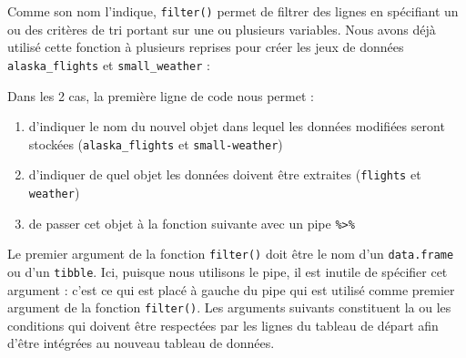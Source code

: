 \documentclass[a4paperpaper,]{article}
\newenvironment{Shaded}{\begin{snugshade}}{\end{snugshade}}
\newcommand{\DecValTok}[1]{\textcolor[rgb]{0.69,0.50,0.00}{#1}}
\newcommand{\KeywordTok}[1]{\textcolor[rgb]{0.12,0.11,0.11}{\textbf{#1}}}
\newcommand{\NormalTok}[1]{\textcolor[rgb]{0.12,0.11,0.11}{#1}}
\newcommand{\OperatorTok}[1]{\textcolor[rgb]{0.12,0.11,0.11}{#1}}
\newcommand{\StringTok}[1]{\textcolor[rgb]{0.75,0.01,0.01}{#1}}
\providecommand{\tightlist}{%
  \setlength{\itemsep}{0pt}\setlength{\parskip}{0pt}}
\begin{document}
Comme son nom l'indique, \texttt{filter()} permet de filtrer des lignes en spécifiant un ou des critères de tri portant sur une ou plusieurs variables. Nous avons déjà utilisé cette fonction à plusieurs reprises pour créer les jeux de données \texttt{alaska\_flights} et \texttt{small\_weather} :

\begin{Shaded}
\end{Shaded}

\begin{Shaded}
\end{Shaded}

Dans les 2 cas, la première ligne de code nous permet :

\begin{enumerate}
\def\labelenumi{\arabic{enumi}.}
\tightlist
\item
  d'indiquer le nom du nouvel objet dans lequel les données modifiées seront stockées (\texttt{alaska\_flights} et \texttt{small-weather})
\item
  d'indiquer de quel objet les données doivent être extraites (\texttt{flights} et \texttt{weather})
\item
  de passer cet objet à la fonction suivante avec un pipe \texttt{\%\textgreater{}\%}
\end{enumerate}

Le premier argument de la fonction \texttt{filter()} doit être le nom d'un \texttt{data.frame} ou d'un \texttt{tibble}. Ici, puisque nous utilisons le pipe, il est inutile de spécifier cet argument : c'est ce qui est placé à gauche du pipe qui est utilisé comme premier argument de la fonction \texttt{filter()}. Les arguments suivants constituent la ou les conditions qui doivent être respectées par les lignes du tableau de départ afin d'être intégrées au nouveau tableau de données.
\end{document}

